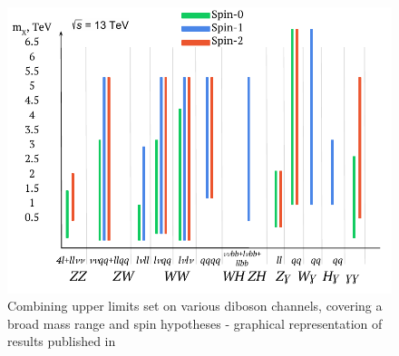 \documentclass{PoS}
\begin{document}
  \begin{figure}
    \begin{center} 
\vspace*{-6mm}
    \includegraphics[width=.5\textwidth]{figures/lim_sketch}
    \end{center}
\vspace*{-8mm}
     \caption{Combining upper limits set on various diboson channels, covering a broad mass range and spin hypotheses - graphical representation of results published in \cite{HIGG-2016-31,HIGG-2016-19,ATLAS-CONF-2018-016,EXOT-2016-30,EXOT-2016-29,EXOT-2016-28,HIGG-2016-17,EXOT-2016-10-2}}
     \label{fig:summary}
     \end{figure}

\vspace*{-6mm}


%
\end{document}

